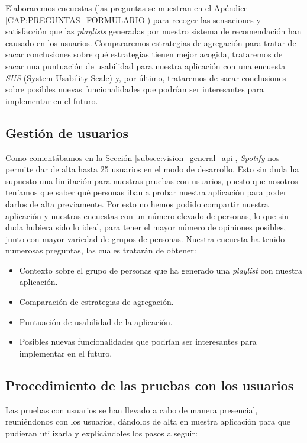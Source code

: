 Elaboraremos encuestas (las preguntas se muestran en el Apéndice \ref{CAP:PREGUNTAS_FORMULARIO}) para recoger las sensaciones y satisfacción
que las \textit{playlists} generadas por nuestro sistema de recomendación han causado en los usuarios. Compararemos estrategias de agregación para tratar de sacar conclusiones
sobre qué estrategias tienen mejor acogida, trataremos de sacar una puntuación de usabilidad para nuestra aplicación 
con una encuesta \textit{SUS} (System Usability Scale) y, por último, trataremos de sacar conclusiones sobre posibles nuevas funcionalidades que podrían ser interesantes 
para implementar en el futuro.

\subsection{Gestión de usuarios\label{SEC:GESTION_USUARIOS}}

Como comentábamos en la Sección \ref{subsec:vision_general_api}, \textit{Spotify} nos permite dar de alta hasta 25 usuarios en el modo de desarrollo. Esto sin duda 
ha supuesto una limitación para nuestras pruebas con usuarios, puesto que nosotros teníamos que saber qué personas
iban a probar nuestra aplicación para poder darlos de alta previamente. Por esto no hemos podido compartir nuestra aplicación y nuestras
encuestas con un número elevado de personas, lo que sin duda hubiera sido lo ideal, para tener el mayor número de opiniones posibles, junto con mayor 
variedad de grupos de personas. Nuestra encuesta ha tenido numerosas preguntas, las cuales tratarán de obtener:

\begin{itemize}
    \item Contexto sobre el grupo de personas que ha generado una \textit{playlist} con nuestra aplicación.
    \item Comparación de estrategias de agregación.
    \item Puntuación de usabilidad de la aplicación.
    \item Posibles nuevas funcionalidades que podrían ser interesantes para implementar en el futuro.
\end{itemize}

\subsection{Procedimiento de las pruebas con los usuarios\label{SEC:PROCEDIMIENTO}}

Las pruebas con usuarios se han llevado a cabo de manera presencial, reuniéndonos con los usuarios, dándolos de alta en nuestra aplicación para que pudieran utilizarla y 
explicándoles los pasos a seguir:

